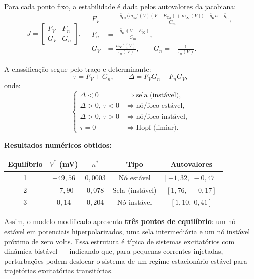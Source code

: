 \documentclass[english,11pt,a4paper]{article}
\begin{document}
	Para cada ponto fixo, a estabilidade é dada pelos autovalores da jacobiana:
	\[
	J=\begin{bmatrix}
		F_V & F_n\\[2pt] G_V & G_n
	\end{bmatrix},\quad
	\begin{aligned}
		F_V&=\frac{-\bar g_{\mathrm{Ca}}\!\big(m_\infty'(V)(V-E_{\mathrm{Ca}})+m_\infty(V)\big)-\bar g_{\mathrm K}n-\bar g_{\mathrm L}}{C_m},\\[2pt]
		F_n&=\frac{-\bar g_{\mathrm K}(V-E_{\mathrm K})}{C_m},\\[2pt]
		G_V&=\frac{n_\infty'(V)}{\tau_n(V)},\qquad
		G_n=-\frac{1}{\tau_n(V)}.
	\end{aligned}
	\]
	
	\noindent A classificação segue pelo traço e determinante:
	\[
	\tau = F_V + G_n,\qquad
	\Delta = F_VG_n - F_nG_V,
	\]
	onde:
	\[
	\begin{cases}
		\Delta<0 &\Rightarrow \text{sela (instável)},\\
		\Delta>0,\ \tau<0 &\Rightarrow \text{nó/foco estável},\\
		\Delta>0,\ \tau>0 &\Rightarrow \text{nó/foco instável},\\
		\tau=0 &\Rightarrow \text{Hopf (limiar)}.
	\end{cases}
	\]
	
	\vspace{1em}
	\noindent\textbf{Resultados numéricos obtidos:}
	
	\begin{center}
		\begin{tabular}{c c c c c}
			\toprule
			Equilíbrio & $V^*$ (mV) & $n^*$ & Tipo & Autovalores \\ 
			\midrule
			1 & $-49{,}56$ & $0{,}0003$ & Nó estável & $[-1{,}32,\ -0{,}47]$ \\
			2 & $-7{,}90$  & $0{,}078$  & Sela (instável) & $[1{,}76,\ -0{,}17]$ \\
			3 & $0{,}14$   & $0{,}204$  & Nó instável & $[1{,}10,\ 0{,}41]$ \\
			\bottomrule
		\end{tabular}
	\end{center}
	
	\noindent Assim, o modelo modificado apresenta \textbf{três pontos de equilíbrio}:
	um nó estável em potenciais hiperpolarizados, uma sela intermediária e um nó instável próximo de zero volts.
	Essa estrutura é típica de sistemas excitatórios com dinâmica bistável — indicando que, para pequenas correntes injetadas,
	perturbações podem deslocar o sistema de um regime estacionário estável para trajetórias excitatórias transitórias.
	
\end{document}
